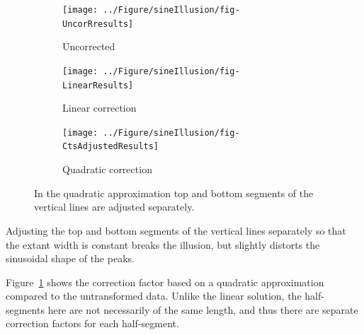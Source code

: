 \documentclass[11pt]{isuthesis}\usepackage[]{graphicx}\usepackage[]{color}
\newenvironment{knitrout}{}{} %
\begin{document}
\begin{figure}
\begin{subfigure}[b]{.32\textwidth}\centering
\begin{knitrout}
\color{fgcolor}

{\centering \texttt{[image: ../Figure/sineIllusion/fig-UncorRresults]} 

}



\end{knitrout}

\caption{Uncorrected}
\end{subfigure}
\begin{subfigure}[b]{.32\textwidth}\centering
\begin{knitrout}
\color{fgcolor}

{\centering \texttt{[image: ../Figure/sineIllusion/fig-LinearResults]} 

}



\end{knitrout}

\caption{Linear correction}
\end{subfigure}
\begin{subfigure}[b]{.32\textwidth}\centering
\begin{knitrout}
\color{fgcolor}

{\centering \texttt{[image: ../Figure/sineIllusion/fig-CtsAdjustedResults]} 

}



\end{knitrout}

\caption{Quadratic correction}
\end{subfigure}
\caption[Quadratic Approximation]{
In the quadratic approximation top and bottom segments of the vertical lines are adjusted separately.}
\label{fig:GeneralQuadraticCorrection} 
\end{figure}

Adjusting the top and bottom segments of the vertical lines separately so that the extant width is constant breaks the illusion, but slightly distorts the sinusoidal shape of the peaks.

Figure~\ref{fig:GeneralQuadraticCorrection} shows the correction factor based on a quadratic approximation compared to the untransformed data. 
Unlike the linear solution, the half-segments here are not necessarily of the same length, and thus there are separate correction factors for each half-segment. 
\end{document}
